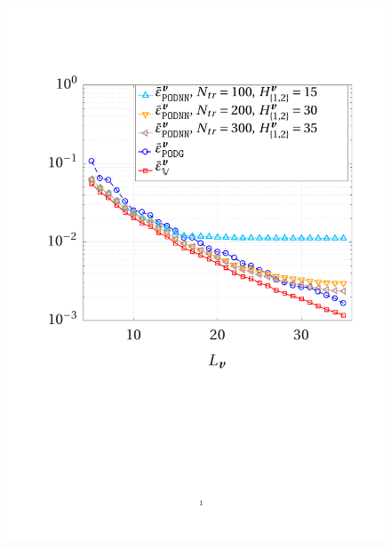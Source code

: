 \documentclass[longtitle]{elsarticle}
\numberwithin{equation}{section}
\theoremstyle{theorem}
\theoremstyle{definition}
\theoremstyle{remark}
\theoremstyle{proposition}
\numberwithin{figure}{section}
\begin{document}
		\begin{figure}[t!]
			\center
			\includegraphics[scale = 0.37, trim = {2cm 9cm 1.5cm 3.5cm}, clip]{dc_200_vel_error_vs_rank_ter}
			\hspace*{1cm}

\end{figure}
\end{document}
